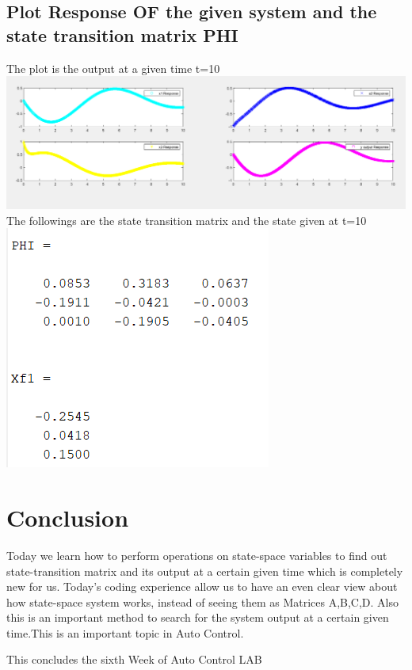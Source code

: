 \documentclass[12pt]{article}
\begin{document}
\subsection{Plot Response OF the given system and the state transition matrix PHI}
The plot is the output at a given time t=10\\

\includegraphics[scale=0.5]{HW2_code_result.png}  \\

The followings are the state transition matrix and the state given at t=10\\

\includegraphics[scale=0.5]{HW2_problem_resultof_phi_state.png} \\


\section{Conclusion}
Today we learn how to perform operations on state-space variables to find out state-transition matrix and its output at a certain given time which is completely new for us. Today's coding experience allow us to have an even clear view about how state-space system works, instead of seeing them as Matrices A,B,C,D. Also this is an important method to search for the system output at a certain given time.This is an important topic in Auto Control.

\begin{center}
This concludes the sixth Week of Auto Control LAB\\
\end{center}
\end{document}
